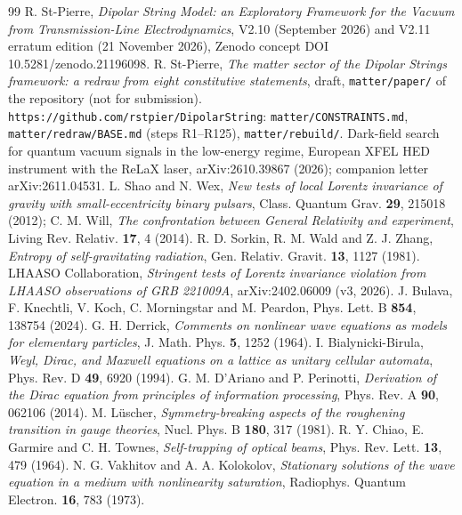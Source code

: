 \documentclass[11pt,a4paper]{article}
\begin{document}
\begin{thebibliography}{99}
 R. St-Pierre, \textit{Dipolar String Model: an Exploratory Framework for the Vacuum from Transmission-Line Electrodynamics}, V2.10 (September 2026) and V2.11 erratum edition (21 November 2026), Zenodo concept DOI 10.5281/zenodo.21196098.
 R. St-Pierre, \textit{The matter sector of the Dipolar Strings framework: a redraw from eight constitutive statements}, draft, \texttt{matter/paper/} of the repository (not for submission).
 \texttt{https://github.com/rstpier/DipolarString}: \texttt{matter/CONSTRAINTS.md}, \texttt{matter/redraw/BASE.md} (steps R1--R125), \texttt{matter/rebuild/}.
 Dark-field search for quantum vacuum signals in the low-energy regime, European XFEL HED instrument with the ReLaX laser, arXiv:2610.39867 (2026); companion letter arXiv:2611.04531.
 L. Shao and N. Wex, \textit{New tests of local Lorentz invariance of gravity with small-eccentricity binary pulsars}, Class. Quantum Grav. \textbf{29}, 215018 (2012); C. M. Will, \textit{The confrontation between General Relativity and experiment}, Living Rev. Relativ. \textbf{17}, 4 (2014).
 R. D. Sorkin, R. M. Wald and Z. J. Zhang, \textit{Entropy of self-gravitating radiation}, Gen. Relativ. Gravit. \textbf{13}, 1127 (1981).
 LHAASO Collaboration, \textit{Stringent tests of Lorentz invariance violation from LHAASO observations of GRB 221009A}, arXiv:2402.06009 (v3, 2026).
 J. Bulava, F. Knechtli, V. Koch, C. Morningstar and M. Peardon, Phys. Lett. B \textbf{854}, 138754 (2024).
 G. H. Derrick, \textit{Comments on nonlinear wave equations as models for elementary particles}, J. Math. Phys. \textbf{5}, 1252 (1964).
 I. Bialynicki-Birula, \textit{Weyl, Dirac, and Maxwell equations on a lattice as unitary cellular automata}, Phys. Rev. D \textbf{49}, 6920 (1994).
 G. M. D'Ariano and P. Perinotti, \textit{Derivation of the Dirac equation from principles of information processing}, Phys. Rev. A \textbf{90}, 062106 (2014).
 M. L\"uscher, \textit{Symmetry-breaking aspects of the roughening transition in gauge theories}, Nucl. Phys. B \textbf{180}, 317 (1981).
 R. Y. Chiao, E. Garmire and C. H. Townes, \textit{Self-trapping of optical beams}, Phys. Rev. Lett. \textbf{13}, 479 (1964).
 N. G. Vakhitov and A. A. Kolokolov, \textit{Stationary solutions of the wave equation in a medium with nonlinearity saturation}, Radiophys. Quantum Electron. \textbf{16}, 783 (1973).

\end{thebibliography}
\end{document}
